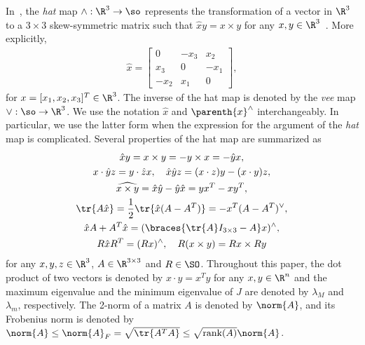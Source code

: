 In~, the \textit{hat} map $\wedge :\R^{3}\rightarrow\so$ represents the transformation of a vector in $\R^{3}$ to a $3\times 3$ skew-symmetric matrix such that $\hat x y = x\times y$ for any $x,y\in\R^{3}$~\cite{bullo2004}. 
More explicitly,
\begin{align*}
    \hat x = \begin{bmatrix} 0 & -x_3 & x_2 \\ x_3 & 0 & -x_1 \\ -x_2 & x_1 & 0\end{bmatrix},
\end{align*}
for $x=[x_1,x_2,x_3]^T\in\R^{3}$. 
The inverse of the hat map is denoted by the \textit{vee} map $\vee:\so\rightarrow\R^{3}$. 
We use the notation \( \hat{x}\) and \( \parenth{x}^\wedge\) interchangeably.
In particular, we use the latter form when the expression for the argument of the \textit{hat} map is complicated. 
Several properties of the hat map are summarized as
\begin{gather}
   \hat x y = x\times y = - y\times x = - \hat y x, \label{eqn:cross_product}\\
    x\cdot \hat y z = y\cdot \hat z x,\quad \hat x\hat y z = (x\cdot z) y - (x\cdot y ) z\label{eqn:STP},\\
    \widehat{x\times y} = \hat x \hat y -\hat y \hat x = yx^T-xy^T,\label{eqn:hatxy}\\
    \tr{A\hat x }=\frac{1}{2}\tr{\hat x (A-A^T)}=-x^T (A-A^T)^\vee,\label{eqn:hat1}\\
    \hat x  A+A^T\hat x=(\braces{\tr{A}I_{3\times 3}-A}x)^{\wedge}, \label{eqn:xAAx} \\
    R\hat x R^T = (Rx)^\wedge,\quad 
    R(x\times y) = Rx\times Ry\label{eqn:RxR}
\end{gather}
for any $x,y,z\in\R^{3}$, $A\in\R^{3\times 3}$ and $R\in\SO$. 
Throughout this paper, the dot product of two vectors is denoted by $x\cdot y = x^T y$ for any $x,y\in\R^n$ and the maximum eigenvalue and the minimum eigenvalue of $J$ are denoted by $\lambda_M$ and $\lambda_m$, respectively. 
The 2-norm of a matrix \( A \) is denoted by \( \norm{A} \), and its Frobenius norm is denoted by \( \norm{A} \leq \norm{A}_F = \sqrt{\tr{A^T A}} \leq \sqrt{\text{rank}(A)} \norm{A} \).

